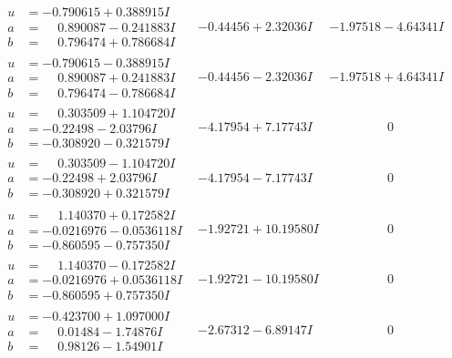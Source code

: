 \documentclass[1p]{elsarticle_modified}
\theoremstyle{definition}
\begin{document}
$$\begin{array}{c|c|c}
\begin{aligned}
u &= -0.790615 + 0.388915 I \\
a &= \phantom{-}0.890087 - 0.241883 I \\
b &= \phantom{-}0.796474 + 0.786684 I\end{aligned}
 & -0.44456 + 2.32036 I & -1.97518 - 4.64341 I \\ \hline\begin{aligned}
u &= -0.790615 - 0.388915 I \\
a &= \phantom{-}0.890087 + 0.241883 I \\
b &= \phantom{-}0.796474 - 0.786684 I\end{aligned}
 & -0.44456 - 2.32036 I & -1.97518 + 4.64341 I \\ \hline\begin{aligned}
u &= \phantom{-}0.303509 + 1.104720 I \\
a &= -0.22498 - 2.03796 I \\
b &= -0.308920 - 0.321579 I\end{aligned}
 & -4.17954 + 7.17743 I & \phantom{-0.000000 } 0 \\ \hline\begin{aligned}
u &= \phantom{-}0.303509 - 1.104720 I \\
a &= -0.22498 + 2.03796 I \\
b &= -0.308920 + 0.321579 I\end{aligned}
 & -4.17954 - 7.17743 I & \phantom{-0.000000 } 0 \\ \hline\begin{aligned}
u &= \phantom{-}1.140370 + 0.172582 I \\
a &= -0.0216976 - 0.0536118 I \\
b &= -0.860595 - 0.757350 I\end{aligned}
 & -1.92721 + 10.19580 I & \phantom{-0.000000 } 0 \\ \hline\begin{aligned}
u &= \phantom{-}1.140370 - 0.172582 I \\
a &= -0.0216976 + 0.0536118 I \\
b &= -0.860595 + 0.757350 I\end{aligned}
 & -1.92721 - 10.19580 I & \phantom{-0.000000 } 0 \\ \hline\begin{aligned}
u &= -0.423700 + 1.097000 I \\
a &= \phantom{-}0.01484 - 1.74876 I \\
b &= \phantom{-}0.98126 - 1.54901 I\end{aligned}
 & -2.67312 - 6.89147 I & \phantom{-0.000000 } 0 \\ \hline\begin{aligned}

\end{aligned}
\end{array}$$
\end{document}
